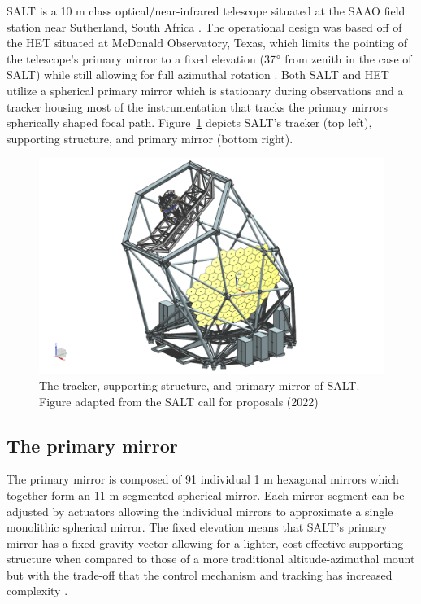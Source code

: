 \gls{SALT} is a 10 m class optical/near-infrared telescope situated at the \gls{SAAO} field station near Sutherland, South Africa \citep{SALT_optical_design}. The operational design was based off of the \gls{HET} situated at McDonald Observatory, Texas, which limits the pointing of the telescope's primary mirror to a fixed elevation (37$\degree$ from zenith in the case of SALT) while still allowing for full azimuthal rotation \citep{HET}. Both SALT and HET utilize a spherical primary mirror which is stationary during observations and a tracker housing most of the instrumentation that tracks the primary mirrors spherically shaped focal path. Figure~\ref{fig:SALT_telescope} depicts \gls{SALT}'s tracker (top left), supporting structure, and primary mirror (bottom right).

\begin{figure}[t]
    \centering
    \includegraphics[width = 15cm]{figures/2_SALT_telescope.png}
    \caption{The tracker, supporting structure, and primary mirror of SALT. Figure adapted from the SALT call for proposals (2022)\protect\footnotemark}
    \label{fig:SALT_telescope}
\end{figure}

\subsection{The primary mirror}

The primary mirror is composed of 91 individual 1 m hexagonal mirrors which together form an 11 m segmented spherical mirror. Each mirror segment can be adjusted by actuators allowing the individual mirrors to approximate a single monolithic spherical mirror. The fixed elevation means that SALT's primary mirror has a fixed gravity vector allowing for a lighter, cost-effective supporting structure when compared to those of a more traditional altitude-azimuthal mount but with the trade-off that the control mechanism and tracking has increased complexity \citep{SALT_design}.

